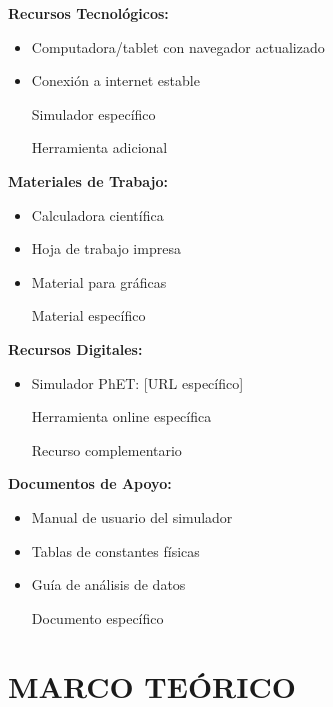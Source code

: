 \documentclass[12pt,a4paper]{article}
\begin{document}
	\begin{materialesbox}
		\begin{multicols}{2}
			\textbf{Recursos Tecnológicos:}
			\begin{itemize}[leftmargin=1cm]
				\item Computadora/tablet con navegador actualizado
				\item Conexión a internet estable
				\item [Simulador específico]
				\item [Herramienta adicional]
			\end{itemize}
			
			\textbf{Materiales de Trabajo:}
			\begin{itemize}[leftmargin=1cm]
				\item Calculadora científica
				\item Hoja de trabajo impresa
				\item Material para gráficas
				\item [Material específico]
			\end{itemize}
			
			\columnbreak
			
			\textbf{Recursos Digitales:}
			\begin{itemize}[leftmargin=1cm]
				\item Simulador PhET: [URL específico]
				\item [Herramienta online específica]
				\item [Recurso complementario]
			\end{itemize}
			
			\textbf{Documentos de Apoyo:}
			\begin{itemize}[leftmargin=1cm]
				\item Manual de usuario del simulador
				\item Tablas de constantes físicas
				\item Guía de análisis de datos
				\item [Documento específico]
			\end{itemize}
		\end{multicols}
	\end{materialesbox}
	
	
	\section{MARCO TEÓRICO}
	
\end{document}
